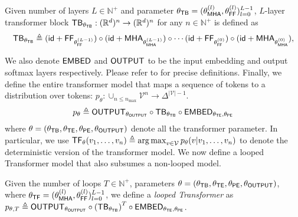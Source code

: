 \begin{definition}\label{defi:transformer_block}
Given number of layers $L\in\mathbb{N}^+$ and parameter $\theta_{\mathsf{TB}} = (\theta^{(l)}_{\mathsf{MHA}},\theta^{(l)}_{\mathsf{FF}} )_{l=0}^{L-1}$, $L$-layer transformer block $\mathsf{TB}_{\theta_{\mathsf{TB}}}:(\mathbb{R}^d)^n\to (\mathbb{R}^d)^n$ for any $n\in\mathbb{N}^+$ is defined as \begin{equation}
    \mathsf{TB}_{\theta_{\mathsf{TB}}} \triangleq (\mathsf{id}+ \mathsf{FF}_{\theta^{(L-1)}_{\mathsf{FF}}})\circ (\mathsf{id}+ \mathsf{MHA}_{\theta^{(L-1)}_{\mathsf{MHA}}})\circ \cdots (\mathsf{id}+ \mathsf{FF}_{\theta^{(0)}_{\mathsf{FF}}})\circ (\mathsf{id}+ \mathsf{MHA}_{\theta^{(0)}_{\mathsf{MHA}}}),
\end{equation}
\end{definition}
We also denote $\mathsf{EMBED}$  and $\mathsf{OUTPUT}$ to be the input embedding and output softmax layers respectively. Please refer to  for precise definitions.
Finally, we define the entire transformer model that maps a sequence of tokens to a distribution over tokens: $p_{\theta}: \cup_{n\le n_{\max}} \mathcal{V}^n\to \Delta^{|\mathcal{V}|-1}$.
\begin{align}
p_{\theta}\triangleq \mathsf{OUTPUT}_{\theta_{\mathsf{OUTPUT}}}\circ \mathsf{TB}_{\theta_{\mathsf{TB}}}\circ \mathsf{EMBED}_{\theta_{\mathsf{TE}},\theta_{\mathsf{PE}}}
\end{align}
where $\theta = (\theta_{\mathsf{TB}},\theta_{\mathsf{TE}},\theta_{\mathsf{PE}},\theta_{\mathsf{OUTPUT}})$ denote all the transformer parameter. 
In particular, we use $\mathsf{TF}_{\theta}(v_1,\ldots,v_n) \triangleq \operatorname*{arg\,max}_{v\in\mathcal{V}} p_{\theta}(v|v_1,\ldots,v_n)$ to denote the deterministic version of the transformer model. 
We now define a looped Transformer model that also subsumes a non-looped model.

\begin{definition}\label{defi:looped_transformer}
Given the number of loops $T\in\mathbb{N}^+$,  parameters $\theta = (\theta_{\mathsf{TB}},\theta_{\mathsf{TE}},\theta_{\mathsf{PE}},\theta_{\mathsf{OUTPUT}})$, where $\theta_{\mathsf{TF}} = (\theta^{(l)}_{\mathsf{MHA}},\theta^{(l)}_{\mathsf{FF}} )_{l=0}^{L-1}$, we define a  \emph{looped Transformer} as  $p_{\theta,T}\triangleq \mathsf{OUTPUT}_{\theta_{\mathsf{OUTPUT}}}\circ \left(\mathsf{TB}_{\theta_{\mathsf{TB}}}\right)^T\circ \mathsf{EMBED}_{\theta_{\mathsf{TE}},\theta_{\mathsf{PE}}}$.
\end{definition}


